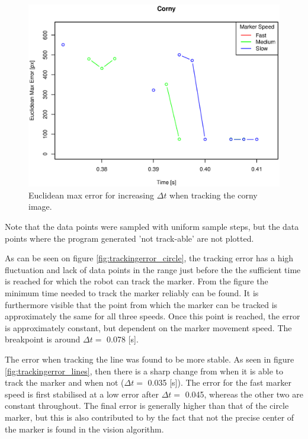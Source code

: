 \begin{figure}[H]
\centering
\includegraphics[width= \fullImageWidth]{graphics/robotics/trackingerror_corny}
\caption{Euclidean max error for increasing $\Delta t$ when tracking the corny image.}
\label{fig:trackingerror_corny}
\end{figure}

Note that the data points were sampled with uniform sample steps, but the data points where the program generated 'not track-able' are not plotted.

As can be seen on figure \ref{fig:trackingerror_circle}, the tracking error has a high fluctuation and lack of data points in the range just before the the sufficient time is reached for which the robot can track the marker.
From the figure the minimum time needed to track the marker reliably can be found.
It is furthermore visible that the point from which the marker can be tracked is approximately the same for all three speeds.
Once this point is reached, the error is approximately constant, but dependent on the marker movement speed.
The breakpoint is around $\Delta t = $ 0.078 [s].

The error when tracking the line was found to be more stable.
As seen in figure \ref{fig:trackingerror_lines}, then there is a sharp change from when it is able to track the marker and when not ($\Delta t = $ 0.035 [s]).
The error for the fast marker speed is first stabilised at a low error after $\Delta t =$ 0.045, whereas the other two are constant throughout.
The final error is generally higher than that of the circle marker, but this is also contributed to by the fact that not the precise center of the marker is found in the vision algorithm.

